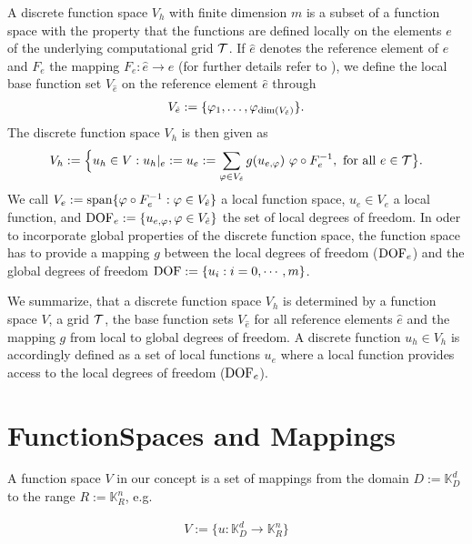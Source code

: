   A discrete function space  $V_h$ with finite dimension $m$ is a subset of a function space with the property that the functions are defined locally on the elements $e$ of the underlying computational grid $\cal T$. If $\hat e $ denotes the reference element of $e$ and $F_e$ the mapping $F_e: \hat e \to e$ (for further details refer to \citep{GitterPapier:06}), we define the local base function set $V_{\hat e}$ on the reference element $\hat e$ through
  \begin{eqnarray}
    V_{\hat e} := \{\varphi_1, \ldots, \varphi_{{\rm dim}(V_{\hat e})}\}. \nonumber 
  \end{eqnarray}
  The discrete function space $V_h$ is then given as 
\begin{eqnarray}
    V_h := \Big\{ u_h \in V: u_h|_e := u_e := \sum_{\varphi \in V_{\hat e}} g(u_{e,\varphi}) \ \varphi \circ F_e^{-1}, \ {\rm for \ all } \ e \in {\cal T}\big\}. \nonumber 
\end{eqnarray}
  We call $V_e := {\rm span}\{\varphi \circ F_e^{-1}: \varphi \in V_{\hat e}\}$ a local function space, $u_e \in V_e$ a local function, and ${\rm DOF}_e := \{u_{e,\varphi}, \varphi \in V_{\hat e}\}$ the set of local degrees of freedom. In oder to incorporate global properties of the discrete function space, the function space has to provide a mapping $g$ between the local degrees of freedom (${\rm DOF}_e$) and the global degrees of freedom ${\rm DOF} := \{ u_i: i = 0, \cdots, m\}$.  

  We summarize, that a discrete function space $V_h$ is determined by a function space $V$, a grid $\cal T$, the base function sets $V_{\hat e}$ for all reference elements $\hat e$ and the mapping $g$ from local to global degrees of freedom. A discrete function $u_h \in V_h$ is accordingly defined as a set of local functions $u_e$ where a local function provides access to the local degrees of freedom (${\rm DOF}_e$).


  \section{FunctionSpaces and Mappings}

   A function space $V$ in our concept is a set of mappings from the domain $D:=\mathbb{K}_D^d$ to the range $R:=\mathbb{K}_R^n$, e.g.

  \begin{eqnarray}
    V := \{ u : \mathbb{K}_D^d \to \mathbb{K}_R^n \} \nonumber 
  \end{eqnarray}

